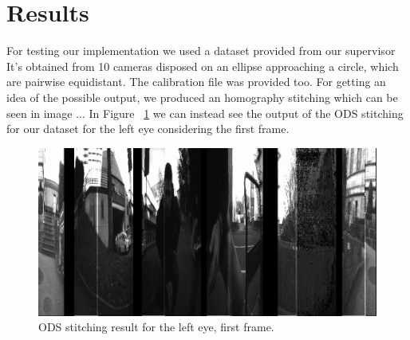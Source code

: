 \documentclass[10pt,twocolumn,letterpaper]{article}
\begin{document}
\section{Results}
\label{results}
For testing our implementation we used a dataset provided from our supervisor It's obtained from 10 cameras disposed on an ellipse approaching a circle, which are pairwise equidistant. The calibration file was provided too. For getting an idea of the possible output, we produced an homography stitching which can be seen in image ...
In Figure ~\ref{lefteye} we can instead see the output of the ODS stitching for our dataset for the left eye considering the first frame.
\begin{figure}[t]
\begin{center}
   \includegraphics[width=0.7\linewidth]{pictures/frame0_lefteye_cwise.png}
\end{center}
   \caption{ODS stitching result for the left eye, first frame.}
\label{lefteye}
\end{figure}

\end{document}
